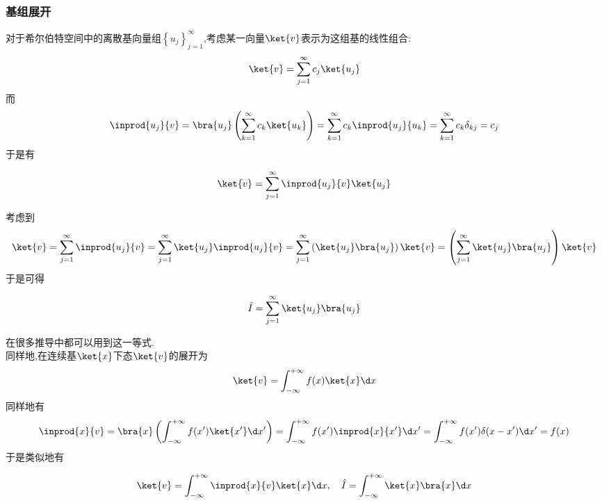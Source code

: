 \documentclass{ctexbook}
\begin{document}
\subsubsection{基组展开}
对于希尔伯特空间中的离散基向量组$\left\{u_j\right\}_{j=1}^{\infty}$,考虑某一向量$\ket{v}$表示为这组基的线性组合:
\[\ket{v}=\sum_{j=1}^{\infty}c_j\ket{u_j}\]
而
\[\inprod{u_j}{v}=\bra{u_j}\left(\sum_{k=1}^{\infty}c_k\ket{u_k}\right)=\sum_{k=1}^{\infty}c_k\inprod{u_j}{u_k}=\sum_{k=1}^{\infty}c_k\delta_{kj}=c_j\]
于是有
\begin{theorem}[离散基组下的展开]
    \[\ket{v}=\sum_{j=1}^{\infty}\inprod{u_j}{v}\ket{u_j}\]
\end{theorem}
考虑到
\[\ket{v}=\sum_{j=1}^{\infty}\inprod{u_j}{v}=\sum_{j=1}^{\infty}\ket{u_j}\inprod{u_j}{v}=\sum_{j=1}^{\infty}\left(\ket{u_j}\bra{u_j}\right)\ket{v}=\left(\sum_{j=1}^{\infty}\ket{u_j}\bra{u_j}\right)\ket{v}\]
于是可得
\begin{theorem}[离散基组下的恒等算符]
    \[\hat{I}=\sum_{j=1}^{\infty}\ket{u_j}\bra{u_j}\]
\end{theorem}
在很多推导中都可以用到这一等式.\\
\indent 同样地,在连续基$\ket{x}$下态$\ket{v}$的展开为
\[\ket{v}=\int_{-\infty}^{+\infty}f(x)\ket{x}\d x\]
同样地有
\[\inprod{x}{v}=\bra{x}\left(\int_{-\infty}^{+\infty}f(x')\ket{x'}\d x'\right)=\int_{-\infty}^{+\infty}f(x')\inprod{x}{x'}\d x'=\int_{-\infty}^{+\infty}f(x')\delta(x-x')\d x'=f(x)\]
于是类似地有
\begin{theorem}[连续基组下的展开和恒等算符]
    \[\ket{v}=\int_{-\infty}^{+\infty}\inprod{x}{v}\ket{x}\d x,\quad\hat{I}=\int_{-\infty}^{+\infty}\ket{x}\bra{x}\d x\]
\end{theorem}
\end{document}
